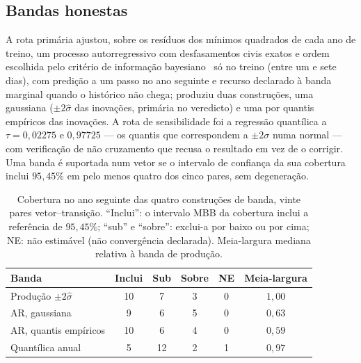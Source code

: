 \subsection{Bandas honestas}
\label{sec:demo-bandas}

A rota primária ajustou, sobre os resíduos dos mínimos quadrados de cada ano
de treino, um processo autorregressivo com desfasamentos civis exatos e
ordem escolhida pelo critério de informação bayesiano~\cite{Schwarz1978} só
no treino (entre um e sete dias), com predição a um passo no ano seguinte e recurso declarado à banda
marginal quando o histórico não chega; produziu duas construções, uma
gaussiana ($\pm 2\hat\sigma$ das inovações, primária no veredicto) e uma por
quantis empíricos das inovações. A rota de sensibilidade foi a regressão
quantílica a $\tau = 0{,}02275$ e $0{,}97725$ --- os quantis que
correspondem a $\pm 2\sigma$ numa normal --- com verificação de não
cruzamento que recusa o resultado em vez de o corrigir. Uma banda é
suportada num vetor se o intervalo de confiança da sua cobertura inclui
$95{,}45\%$ em pelo menos quatro dos cinco pares, sem degeneração.

\begin{table}[htbp]
  \centering
  \caption[Bandas alternativas nos vinte pares]{Cobertura no ano seguinte
  das quatro construções de banda, vinte pares vetor--transição. ``Inclui'':
  o intervalo MBB da cobertura inclui a referência de $95{,}45\%$; ``sub'' e
  ``sobre'': exclui-a por baixo ou por cima; NE: não estimável (não
  convergência declarada). Meia-largura mediana relativa à banda de
  produção.}
  \label{tab:bandas}
  \begin{tabular}{lccccc}
    \toprule
    Banda & Inclui & Sub & Sobre & NE & Meia-largura \\
    \midrule
    Produção $\pm 2\hat\sigma$   & 10 & 7  & 3 & 0 & $1{,}00$ \\
    AR, gaussiana                & 9  & 6  & 5 & 0 & $0{,}63$ \\
    AR, quantis empíricos        & 10 & 6  & 4 & 0 & $0{,}59$ \\
    Quantílica anual             & 5  & 12 & 2 & 1 & $0{,}97$ \\
    \bottomrule
  \end{tabular}
\end{table}

